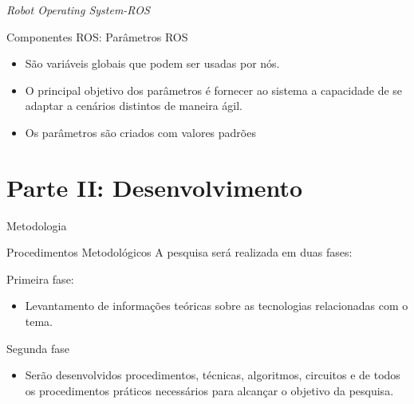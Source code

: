 \documentclass[10pt]{beamer}
\begin{document}
\begin{frame}{\textit{Robot Operating System-ROS}}
	\begin{alertblock}{Componentes ROS: Parâmetros ROS}
		\vspace{1cm}
		\begin{itemize}
			\setlength\itemsep{1.4em}
			\item São variáveis globais que podem ser usadas por nós.
			\item O principal objetivo dos parâmetros é fornecer ao sistema a capacidade de	se adaptar a cenários distintos de maneira ágil.
			\item Os parâmetros são	criados com valores padrões
		\end{itemize}
	\end{alertblock}
\end{frame}



\section{Parte II: Desenvolvimento}




\begin{frame}{Metodologia}
    \begin{alertblock}{Procedimentos Metodológicos}
        A pesquisa será realizada em duas fases:
        \begin{block}{Primeira fase:}
            \begin{itemize}
                \item Levantamento de informações teóricas sobre as tecnologias relacionadas com o tema.
            \end{itemize}
        \end{block}
    
        \begin{block}{Segunda fase}
            \begin{itemize}
                \item Serão desenvolvidos procedimentos, técnicas, algoritmos, circuitos e de todos os procedimentos práticos necessários para alcançar o objetivo da pesquisa.
            \end{itemize}
        \end{block}
    \end{alertblock}

  
\end{frame}
\end{document}
